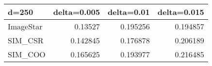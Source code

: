 \begin{tabular}{lrrr}
\hline
 d=250     &   delta=0.005 &   delta=0.01 &   delta=0.015 \\
\hline
 ImageStar &      0.13527  &     0.195256 &      0.194857 \\
 SIM\_CSR   &      0.142845 &     0.176878 &      0.206189 \\
 SIM\_COO   &      0.165625 &     0.193977 &      0.216485 \\
\hline
\end{tabular}
